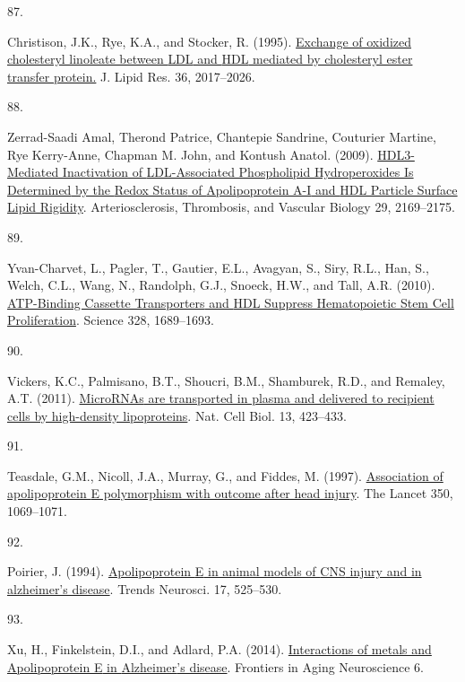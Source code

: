\documentclass[
]{article}
\newlength{\cslhangindent}
\newlength{\csllabelwidth}
\newlength{\cslentryspacingunit} %
\newenvironment{CSLReferences}[2] %
 {%
  \setlength{\parindent}{0pt}
  \ifodd #1
  \let\oldpar\par
  \def\par{\hangindent=\cslhangindent\oldpar}
  \fi
  \setlength{\parskip}{#2\cslentryspacingunit}
 }%
 {}
\newcommand{\CSLLeftMargin}[1]{\parbox[t]{\csllabelwidth}{#1}}
\newcommand{\CSLRightInline}[1]{\parbox[t]{\linewidth - \csllabelwidth}{#1}\break}
\begin{document}
\begin{CSLReferences}{0}{0}
\leavevmode{}%
\CSLLeftMargin{87. }
\CSLRightInline{Christison, J.K., Rye, K.A., and Stocker, R. (1995). \href{https://doi.org/10.1016/S0022-2275(20)41119-8}{Exchange of oxidized cholesteryl linoleate between {LDL} and {HDL} mediated by cholesteryl ester transfer protein.} J. Lipid Res. 36, 2017--2026.}

\leavevmode{}%
\CSLLeftMargin{88. }
\CSLRightInline{Zerrad-Saadi Amal, Therond Patrice, Chantepie Sandrine, Couturier Martine, Rye Kerry-Anne, Chapman M. John, and Kontush Anatol. (2009). \href{https://doi.org/10.1161/ATVBAHA.109.194555}{{HDL3-Mediated Inactivation} of {LDL-Associated Phospholipid Hydroperoxides Is Determined} by the {Redox Status} of {Apolipoprotein A-I} and {HDL Particle Surface Lipid Rigidity}}. Arteriosclerosis, Thrombosis, and Vascular Biology 29, 2169--2175.}

\leavevmode{}%
\CSLLeftMargin{89. }
\CSLRightInline{Yvan-Charvet, L., Pagler, T., Gautier, E.L., Avagyan, S., Siry, R.L., Han, S., Welch, C.L., Wang, N., Randolph, G.J., Snoeck, H.W., and Tall, A.R. (2010). \href{https://doi.org/10.1126/science.1189731}{{ATP-Binding Cassette Transporters} and {HDL Suppress Hematopoietic Stem Cell Proliferation}}. Science 328, 1689--1693.}

\leavevmode{}%
\CSLLeftMargin{90. }
\CSLRightInline{Vickers, K.C., Palmisano, B.T., Shoucri, B.M., Shamburek, R.D., and Remaley, A.T. (2011). \href{https://doi.org/10.1038/ncb2210}{{MicroRNAs} are transported in plasma and delivered to recipient cells by high-density lipoproteins}. Nat. Cell Biol. 13, 423--433.}

\leavevmode{}%
\CSLLeftMargin{91. }
\CSLRightInline{Teasdale, G.M., Nicoll, J.A., Murray, G., and Fiddes, M. (1997). \href{https://doi.org/10.1016/S0140-6736(97)04318-3}{Association of apolipoprotein {E} polymorphism with outcome after head injury}. The Lancet 350, 1069--1071.}

\leavevmode{}%
\CSLLeftMargin{92. }
\CSLRightInline{Poirier, J. (1994). \href{https://doi.org/10.1016/0166-2236(94)90156-2}{Apolipoprotein {E} in animal models of {CNS} injury and in alzheimer's disease}. Trends Neurosci. 17, 525--530.}

\leavevmode{}%
\CSLLeftMargin{93. }
\CSLRightInline{Xu, H., Finkelstein, D.I., and Adlard, P.A. (2014). \href{https://doi.org/10.3389/fnagi.2014.00121}{Interactions of metals and {Apolipoprotein E} in {Alzheimer}'s disease}. Frontiers in Aging Neuroscience 6.}


\end{CSLReferences}
\end{document}
